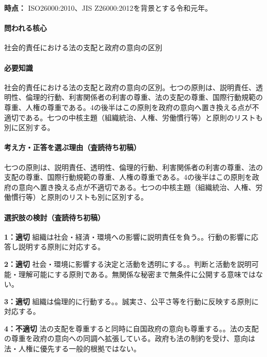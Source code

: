 \noindent\textbf{時点：} ISO26000:2010、JIS Z26000:2012を背景とする令和元年。\par

\paragraph{問われる核心} 社会的責任における法の支配と政府の意向の区別

\paragraph{必要知識} 社会的責任における法の支配と政府の意向の区別。七つの原則は、説明責任、透明性、倫理的行動、利害関係者の利害の尊重、法の支配の尊重、国際行動規範の尊重、人権の尊重である。4の後半はこの原則を政府の意向へ置き換える点が不適切である。七つの中核主題（組織統治、人権、労働慣行等）と原則のリストも別に区別する。

\paragraph{考え方・正答を選ぶ理由（査読待ち初稿）} 七つの原則は、説明責任、透明性、倫理的行動、利害関係者の利害の尊重、法の支配の尊重、国際行動規範の尊重、人権の尊重である。4の後半はこの原則を政府の意向へ置き換える点が不適切である。七つの中核主題（組織統治、人権、労働慣行等）と原則のリストも別に区別する。

\paragraph{選択肢の検討（査読待ち初稿）}\mbox{}\par

\noindent\textbf{1：適切} 組織は社会・経済・環境への影響に説明責任を負う。。行動の影響に応答し説明する原則に対応する。\par

\noindent\textbf{2：適切} 社会・環境に影響する決定と活動を透明にする。。判断と活動を説明可能・理解可能にする原則である。無関係な秘密まで無条件に公開する意味ではない。\par

\noindent\textbf{3：適切} 組織は倫理的に行動する。。誠実さ、公平さ等を行動に反映する原則に対応する。\par

\noindent\textbf{4：不適切} 法の支配を尊重すると同時に自国政府の意向も尊重する。。法の支配の尊重を政府の意向への同調へ拡張している。政府も法の制約を受け、意向は法・人権に優先する一般的根拠ではない。\par

